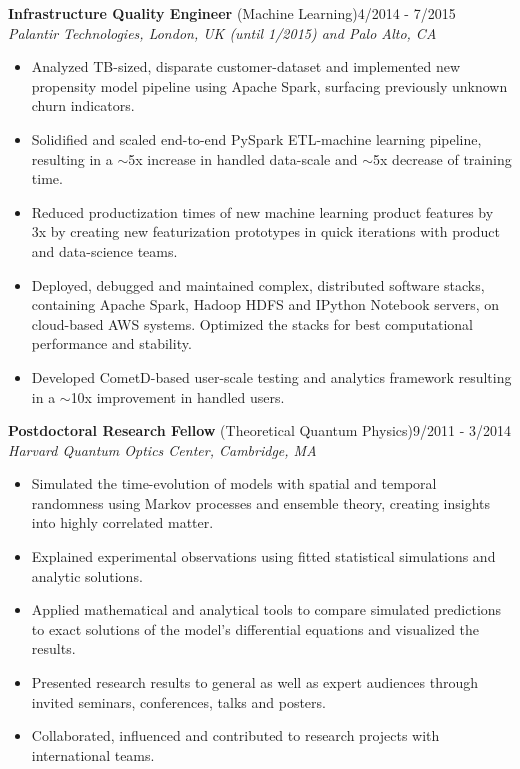 \documentclass[10pt,centered]{./res} %
\begin{document}
\begin{resume}
{\bf Infrastructure Quality Engineer} (Machine Learning)\hfill4/2014 - 7/2015 \\
{\it Palantir Technologies, London, UK (until 1/2015) and Palo Alto, CA}
\begin{itemize}
  \item Analyzed TB-sized, disparate customer-dataset and implemented new propensity model pipeline using Apache Spark, surfacing previously unknown churn indicators.
  \item Solidified and scaled end-to-end PySpark ETL-machine learning pipeline, resulting in a $\sim$5x increase in handled data-scale and $\sim$5x decrease of training time.
  \item Reduced productization times of new machine learning product features by 3x by creating new featurization prototypes in quick iterations with product and data-science teams.
  \item Deployed, debugged and maintained complex, distributed software stacks, containing Apache Spark, Hadoop HDFS and IPython Notebook servers, on cloud-based AWS systems. Optimized the stacks for best computational performance and stability.
  \item Developed CometD-based user-scale testing and analytics framework resulting in a $\sim$10x improvement in handled users.
\end{itemize}

{\bf Postdoctoral Research Fellow} (Theoretical Quantum Physics)\hfill 9/2011 - 3/2014 \\
{\it Harvard Quantum Optics Center, Cambridge, MA}
\begin{itemize}
  \item Simulated the time-evolution of models with spatial and temporal randomness using Markov processes and ensemble theory, creating insights into highly correlated matter.
  \item Explained experimental observations using fitted statistical simulations and analytic solutions.
  \item Applied mathematical and analytical tools to compare simulated predictions to exact solutions of the model's differential equations and visualized the results.
  \item Presented research results to general as well as expert audiences through invited seminars, conferences, talks and posters.
  \item Collaborated, influenced and contributed to research projects with international teams.
\end{itemize}


\end{resume}
\end{document}
